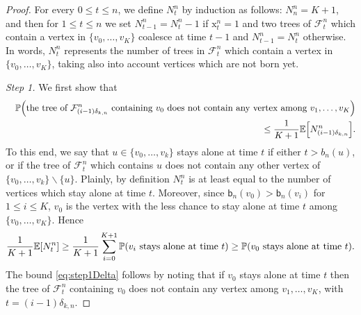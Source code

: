 \documentclass[11pt]{article}
\theoremstyle{plain}
\theoremstyle{definition}
\theoremstyle{remark}
\newcommand{\1}{\mathbbm{1}} %
\newcommand{\esp}[1]{\mathbb{E}\left[#1\right]} %
\newcommand{\proba}[1]{\mathbb{P}\left(#1\right)} %
\newcommand{\F}{\mathcal{F}} %
\newcommand{\birth}{\mathsf{b}} %
\newcommand{\X}{\mathrm x} %
\let\originalleft\left
\let\originalright\right
\renewcommand{\left}{\mathopen{}\mathclose\bgroup\originalleft}
\renewcommand{\right}{\aftergroup\egroup\originalright}
\begin{document}
\begin{proof}
For every $0\leq t \leq n$, we define $N_t^n$ by induction as follows: $N_n^n=K+1$, and then for $1 \leq t \leq n$ we set $N_{t-1}^n=N_t^n-1$ if $\X^n_t=1$ and two trees of $\F^n_t$ which contain a vertex in $\{v_{0},\dots, v_{K}\}$ coalesce at time $t-1$ and  $N_{t-1}^n=N_t^n$ otherwise. In words, $N_t^n$ represents the number of trees in $\F^n_t$ which contain a vertex in $ \{v_{0}, \ldots,v_{K}\}$, taking also into account vertices which are not born yet.


\emph{Step 1.} We first show that
\begin{eqnarray}
\label{eq:step1Delta}
&&\proba{\textrm{the tree of } \F^{n}_{ (i-1)\delta_{k,n} } \textrm{ containing } v_0 \textrm{ does not contain any vertex among } v_{1}, \ldots,v_{K}} \notag \\
& & \qquad \qquad \qquad \qquad \qquad \qquad \qquad\qquad\qquad\qquad\qquad\qquad  \leq \frac{1}{K+1} \esp{N^{n}_{(i-1) \delta_{k,n}  }}.
\end{eqnarray}
To this end, we say that $u\in \{v_{0},\ldots,v_{k}\}$ stays alone at time $t$ if either $t>b_{n}(u)$, or if the tree of $\F^n_t$ which contains $u$ does not contain any other vertex  of $\{v_{0},\dots,v_{k}\} \backslash \{u\} $. Plainly, by definition $N^n_t$ is at least equal to the number of vertices which stay alone at time $t$. Moreover, since $\birth_{n}(v_{0})>\birth_{n}(v_i)$ for $1 \leq i \leq K$,  $v_{0}$ is the vertex with the less chance to stay alone at time $t$ among $ \{v_{0}, \ldots,v_{K}\}$. Hence
\[ \frac{1}{K+1}\esp{N^n_t}\geq \frac{1}{K+1}\sum_{i=0}^{K+1} \proba{v_{i} \text{ stays alone at time } t}\geq  \proba{v_0 \text{ stays alone at time }t}.\]
The bound \eqref{eq:step1Delta} follows by noting that if $v_{0}$ stays alone at time $t$ then the tree of $\F^{n}_{t}$ containing $v_{0}$ does not contain any vertex among $v_{1}, \ldots,v_{K}$, with $t= (i-1) \delta_{k,n} $.




\end{proof}
\end{document}

